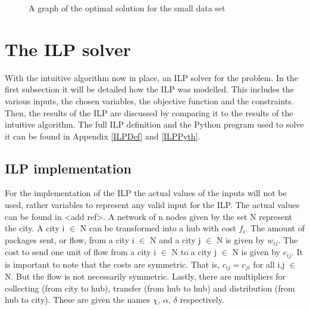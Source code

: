 \documentclass{article}
\begin{document}
\begin{figure}[h]
\centering
{}
\caption{A graph of the optimal solution for the small data set}
\end{figure}


 
\newpage  
\section{The ILP solver}
\label{LPSolver}
With the intuitive algorithm now in place, an ILP solver for the problem. In the first subsection it will be detailed how the ILP was modelled. This includes the various inputs, the chosen variables, the objective function and the constraints. Then, the results of the ILP are discussed by comparing it to the results of the intuitive algorithm. The full ILP definition and the Python program used to solve it can be found in Appendix \ref{ILPDef} and \ref{ILPPyth}.

\subsection{ILP implementation}
\label{ILPimp}
For the implementation of the ILP the actual values of the inputs will not be used, rather variables to represent any valid input for the ILP. The actual values can be found in <add ref>. A network of n nodes given by the set N represent the city. A city i $\in$ N can be transformed into a hub with cost $f_i$. The amount of packages sent, or flow, from a city i $\in$ N and a city j $\in$ N is given by $w_{ij}$. The cost to send one unit of flow from a city i $\in$ N to a city j $\in$ N is given by $c_{ij}$. It is important to note that the costs are symmetric. That is, $c_{ij} = c_{ji}$ for all i,j $\in$ N. But the flow is not necessarily symmetric. Lastly, there are multipliers for collecting (from city to hub), transfer (from hub to hub) and distribution (from hub to city). These are given the names $\chi$, $\alpha$, $\delta$ respectively.
    
\end{document}
